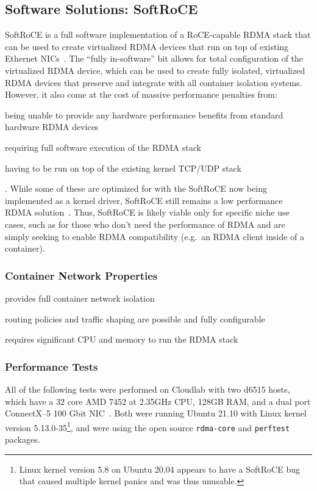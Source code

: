 \documentclass[12pt,titlepage]{article}
\begin{document}
\subsection{Software Solutions: SoftRoCE}
SoftRoCE is a full software implementation of a RoCE-capable RDMA stack that can be used to create virtualized RDMA devices that run on top of existing Ethernet NICs~\cite{softroceoverview}. 
The ``fully in-software'' bit allows for total configuration of the virtualized RDMA device, which can be used to create fully isolated, virtualized RDMA devices that preserve and integrate with all container isolation systems.
However, it also come at the cost of massive performance penalties from: 
\begin{enumerate*}[label={(\arabic*)},itemjoin*={{, and }},itemjoin={{, }}]
	\item being unable to provide any hardware performance benefits from standard hardware RDMA devices
	\item requiring full software execution of the RDMA stack
	\item having to be run on top of the existing kernel TCP/UDP stack
\end{enumerate*}.
While some of these are optimized for with the SoftRoCE now being implemented as a kernel driver, SoftRoCE still remains a low performance RDMA solution~\cite{softrocedriver}.
Thus, SoftRoCE is likely viable only for specific niche use cases, such as for those who don't need the performance of RDMA and are simply seeking to enable RDMA compatibility (e.g.\ an RDMA client inside of a container).

\subsubsection*{Container Network Properties}
\begin{description}[nolistsep,font={{\scshape\bfseries}}]
	\item[Network Isolation] provides full container network isolation
	\item[Controllability] routing policies and traffic shaping are possible and fully configurable
	\item[Resource Utilization] requires significant CPU and memory to run the RDMA stack
\end{description}

\subsubsection*{Performance Tests}
All of the following tests were performed on Cloudlab with two d6515 hosts, which have a 32 core AMD 7452 at 2.35GHz CPU, 128GB RAM, and a dual port ConnectX--5 100 Gbit NIC~\cite{cloudlab}. 
Both were running Ubuntu 21.10 with Linux kernel version 5.13.0-35\footnote{Linux kernel version 5.8 on Ubuntu 20.04 appears to have a SoftRoCE bug that caused multiple kernel panics and was thus unusable.}, and were using the open source \texttt{rdma-core} and \texttt{perftest} packages.
\end{document}

